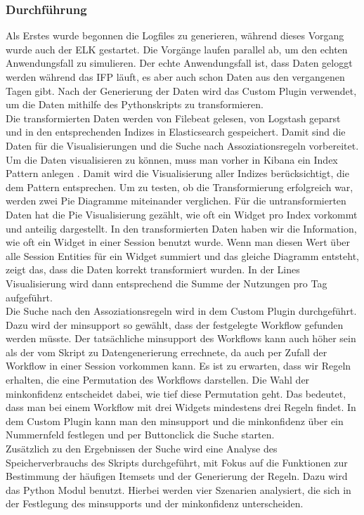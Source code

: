 \subsubsection{Durchführung}
\label{ssub:Durchführung}
Als Erstes wurde begonnen die Logfiles zu generieren, während dieses Vorgang wurde auch der ELK gestartet. Die Vorgänge laufen parallel ab, um den echten Anwendungsfall zu simulieren. Der echte Anwendungsfall ist, dass Daten geloggt werden während das IFP läuft, es aber auch schon Daten aus den vergangenen Tagen gibt. Nach der Generierung der Daten wird das Custom Plugin verwendet, um die Daten mithilfe des Pythonskripts zu transformieren. \\
Die transformierten Daten werden von Filebeat gelesen, von Logstash geparst und in den entsprechenden Indizes in Elasticsearch gespeichert. Damit sind die Daten für die Visualisierungen und die Suche nach Assoziationsregeln vorbereitet. \\
Um die Daten visualisieren zu können, muss man vorher in Kibana ein Index Pattern anlegen \citep{KibIndexPatt20}. Damit wird die Visualisierung aller Indizes berücksichtigt, die dem Pattern entsprechen. Um zu testen, ob die Transformierung erfolgreich war, werden zwei Pie Diagramme miteinander verglichen. Für die untransformierten Daten hat die Pie Visualisierung gezählt, wie oft ein Widget pro Index vorkommt und anteilig dargestellt. In den transformierten Daten haben wir die Information, wie oft ein Widget in einer Session benutzt wurde. Wenn man diesen Wert über alle Session Entities für ein Widget summiert und das gleiche Diagramm entsteht, zeigt das, dass die Daten korrekt transformiert wurden. In der Lines Visualisierung wird dann entsprechend die Summe der Nutzungen pro Tag aufgeführt.\\
Die Suche nach den Assoziationsregeln wird in dem Custom Plugin durchgeführt. Dazu wird der minsupport so gewählt, dass der festgelegte Workflow gefunden werden müsste. Der tatsächliche minsupport des Workflows kann auch höher sein als der vom Skript zu Datengenerierung errechnete, da auch per Zufall der Workflow in einer Session vorkommen kann. Es ist zu erwarten, dass wir Regeln erhalten, die eine Permutation des Workflows darstellen. Die Wahl der minkonfidenz entscheidet dabei, wie tief diese Permutation geht. Das bedeutet, dass man bei einem Workflow mit drei Widgets mindestens drei Regeln findet. In dem Custom Plugin kann man den minsupport und die minkonfidenz über ein Nummernfeld festlegen und per Buttonclick die Suche starten.\\
Zusätzlich zu den Ergebnissen der Suche wird eine Analyse des Speicherverbrauchs des Skripts durchgeführt, mit Fokus auf die Funktionen zur Bestimmung der häufigen Itemsets und der Generierung der Regeln. Dazu wird das Python Modul \mbox{} \citep{PeGe20} benutzt. Hierbei werden vier Szenarien analysiert, die sich in der Festlegung des minsupports und der minkonfidenz unterscheiden.


